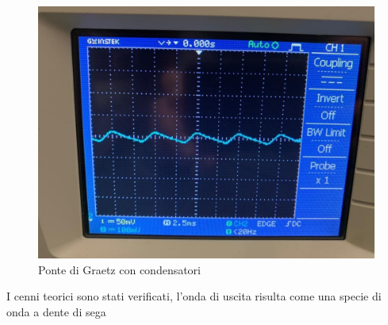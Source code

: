 \documentclass[12pt]{article}
\begin{document}
    \begin{figure}[H]
        \centering
        \includegraphics[scale=0.1]{media/pgc-osc.jpg}       
        \caption{Ponte di Graetz con condensatori}   
    \end{figure}
    \noindent I cenni teorici sono stati verificati, l'onda di uscita risulta come una specie di onda a dente di sega\\
\end{document}
